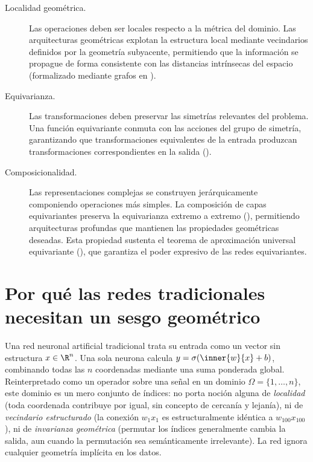 \begin{description}
\item[Localidad geom\'etrica.] Las operaciones deben ser locales respecto a la
m\'etrica del dominio. Las arquitecturas geom\'etricas explotan la estructura
local mediante vecindarios definidos por la geometr\'ia subyacente, permitiendo
que la informaci\'on se propague de forma consistente con las distancias
intr\'insecas del espacio (formalizado mediante grafos en ).
\item[Equivarianza.] Las transformaciones deben preservar las simetr\'ias
relevantes del problema. Una funci\'on equivariante conmuta con las acciones del
grupo de simetr\'ia, garantizando que transformaciones equivalentes de la entrada
produzcan transformaciones correspondientes en la salida
().
\item[Composicionalidad.] Las representaciones complejas se construyen
jer\'arquicamente componiendo operaciones m\'as simples. La composici\'on de capas
equivariantes preserva la equivarianza extremo a extremo
(), permitiendo arquitecturas profundas que
mantienen las propiedades geom\'etricas deseadas. Esta propiedad sustenta el
teorema de aproximaci\'on universal equivariante (),
que garantiza el poder expresivo de las redes equivariantes.
\end{description}

\section{Por qu\'e las redes tradicionales necesitan un sesgo geom\'etrico}
\label{sec:priors:motivation}

Una red neuronal artificial tradicional trata su entrada como un vector sin
estructura $x \in \R^n$. Una sola neurona calcula $y = \sigma(\inner{w}{x} + b)$,
combinando todas las $n$ coordenadas mediante una suma ponderada global.
Reinterpretado como un operador sobre una se\~nal en un dominio
$\Omega = \{1, \dots, n\}$, este dominio es un mero conjunto de \'indices: no
porta noci\'on alguna de \emph{localidad} (toda coordenada contribuye por igual,
sin concepto de cercan\'ia y lejan\'ia), ni de \emph{vecindario estructurado} (la
conexi\'on $w_1 x_1$ es estructuralmente id\'entica a $w_{100} x_{100}$), ni de
\emph{invarianza geom\'etrica} (permutar los \'indices generalmente cambia la
salida, aun cuando la permutaci\'on sea sem\'anticamente irrelevante). La red
ignora cualquier geometr\'ia impl\'icita en los datos.

